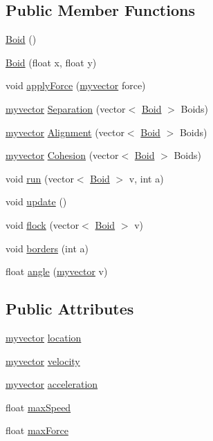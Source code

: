 \subsection*{Public Member Functions}
\begin{DoxyCompactItemize}
\item 
\hyperlink{classBoid_a5a0e15d769fc6831b6ad5c36135d7a83}{Boid} ()
\item 
\hyperlink{classBoid_a61c7081f12c16ba99dc4b3c094195bb2}{Boid} (float x, float y)
\item 
void \hyperlink{classBoid_ad73e4b8c1af1ed53cd6e5b4fd020c81e}{apply\+Force} (\hyperlink{classmyvector}{myvector} force)
\item 
\hyperlink{classmyvector}{myvector} \hyperlink{classBoid_a00eab0293372dcac7379d4deec39b430}{Separation} (vector$<$ \hyperlink{classBoid}{Boid} $>$ Boids)
\item 
\hyperlink{classmyvector}{myvector} \hyperlink{classBoid_a955a16c0223345823aadbe4493b0e982}{Alignment} (vector$<$ \hyperlink{classBoid}{Boid} $>$ Boids)
\item 
\hyperlink{classmyvector}{myvector} \hyperlink{classBoid_af8bff195217c6fd82ad390282d12f427}{Cohesion} (vector$<$ \hyperlink{classBoid}{Boid} $>$ Boids)
\item 
void \hyperlink{classBoid_ad7577660df05b58b00449c12cbc9ecdd}{run} (vector$<$ \hyperlink{classBoid}{Boid} $>$ v, int a)
\item 
void \hyperlink{classBoid_a7404d18dcb7dfc669e80c534819fa893}{update} ()
\item 
void \hyperlink{classBoid_ab8696c8548189dba88f59d917a2212fb}{flock} (vector$<$ \hyperlink{classBoid}{Boid} $>$ v)
\item 
void \hyperlink{classBoid_af1bc54215ea897a0ae4b92048073d863}{borders} (int a)
\item 
float \hyperlink{classBoid_aa5a1ed6464e44da8bef955e848635739}{angle} (\hyperlink{classmyvector}{myvector} v)
\end{DoxyCompactItemize}
\subsection*{Public Attributes}
\begin{DoxyCompactItemize}
\item 
\hyperlink{classmyvector}{myvector} \hyperlink{classBoid_a1494747f6a02c9117b581bd7f77b0c27}{location}
\item 
\hyperlink{classmyvector}{myvector} \hyperlink{classBoid_a485c85be8c3f465a2a0f07de3e0449e0}{velocity}
\item 
\hyperlink{classmyvector}{myvector} \hyperlink{classBoid_aea00ef84171ec7ae51a5d299001c673b}{acceleration}
\item 
float \hyperlink{classBoid_ac57e1058fb698a542990405ecfd1d88b}{max\+Speed}
\item 
float \hyperlink{classBoid_a2a6d579118276efaeac7ba0e4b872afd}{max\+Force}
\end{DoxyCompactItemize}


